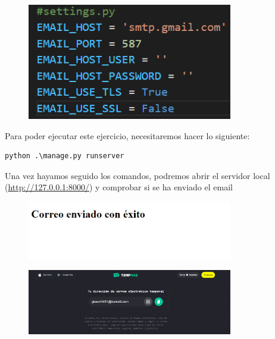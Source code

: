 \documentclass{article}
\begin{document}
\begin{enumerate}
\begin{description}
\begin{description}
\begin{figure}[H]
		\centering
		\includegraphics[width=0.8\textwidth,keepaspectratio]{img/Ejercicio4/2.png}
	\end{figure}
\end{description}
Para poder ejecutar este ejercicio, necesitaremos hacer lo siguiente:
\begin{lstlisting}
python .\manage.py runserver
\end{lstlisting}
Una vez hayamos seguido los comandos, podremos abrir el servidor local (\url{http://127.0.0.1:8000/}) y comprobar si se ha enviado el email
\begin{figure}[H]
		\centering
		\includegraphics[width=0.8\textwidth,keepaspectratio]{img/Ejercicio4/3.png}
	\end{figure}
\begin{figure}[H]
		\centering
		\includegraphics[width=0.8\textwidth,keepaspectratio]{img/Ejercicio4/4.png}
	\end{figure}
\begin{description}
[--] \setcounter{secnumdepth}{0}

\end{description}
\end{description}
\end{enumerate}
\end{document}
